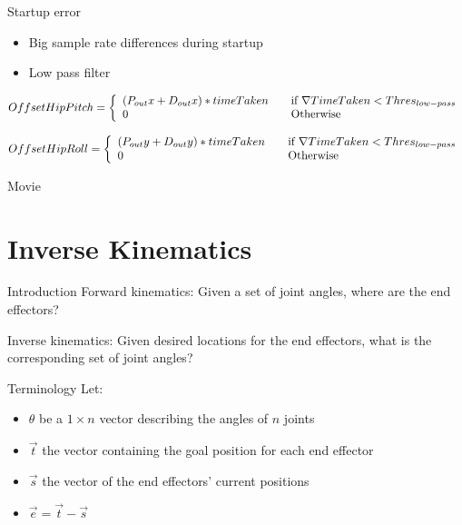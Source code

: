 \documentclass{beamer}
\begin{document}
\begin{frame}{Startup error}
\begin{itemize}
\item Big sample rate differences during startup
\item Low pass filter
\vspace{5 mm}
\end{itemize}
\footnotesize
\[
  Offset Hip Pitch = \left\{ 
  \begin{array}{l l}
     (P_{out}x + D_{out}x) * timeTaken& \quad \text{if $\nabla TimeTaken < Thres_{low-pass}$}\\ 
    0 & \quad \text{Otherwise}\\
  \end{array} \right.
\]

\[
  Offset Hip Roll = \left\{ 
  \begin{array}{l l}
     (P_{out}y + D_{out}y) * timeTaken& \quad \text{if $\nabla TimeTaken < Thres_{low-pass}$}\\ 
    0 & \quad \text{Otherwise}\\
  \end{array} \right.
\]
\normalsize
\end{frame}

\begin{frame}{Movie}

\end{frame}

\section{Inverse Kinematics}
\begin{frame}{Introduction}
  Forward kinematics: Given a set of joint angles, where are the end effectors?
  
  Inverse kinematics: Given desired locations for the end effectors, what is the
  corresponding set of joint angles?
\end{frame}

\begin{frame}{Terminology}
  Let:
  \begin{itemize}
  \item $\theta$ be a $1 \times n$ vector describing the angles of $n$ joints
  \item $\vec{t}$ the vector containing the goal position for each end effector
  \item $\vec{s}$ the vector of the end effectors' current positions
  \item $\vec{e} = \vec{t} - \vec{s}$
  \end{itemize}
\end{frame}
\end{document}
